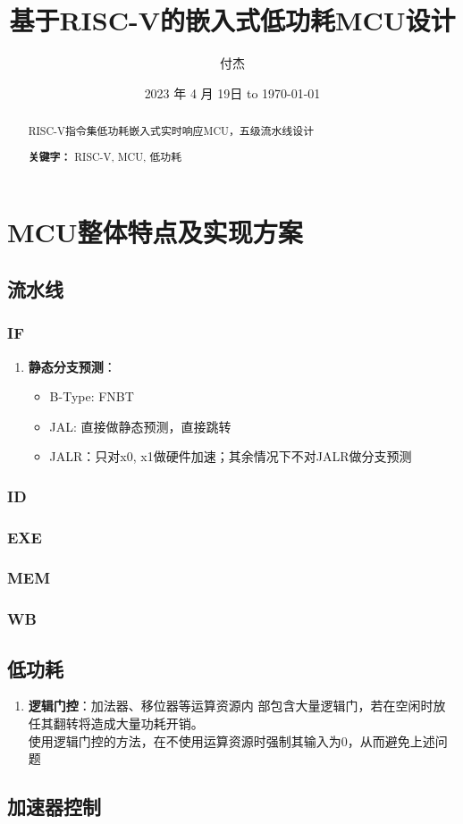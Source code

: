 \documentclass{article}
\title{基于RISC-V的嵌入式低功耗MCU设计}
\author{付杰}
\date{2023 年 4 月 19日 to \today}
\begin{document}
\maketitle
\newpage

\begin{abstract} %
  RISC-V指令集低功耗嵌入式实时响应MCU，五级流水线设计
  \par\textbf{关键字：} RISC-V, MCU, 低功耗
\end{abstract}
\newpage

\tableofcontents %
\newpage


\section{MCU整体特点及实现方案}
\subsection{流水线}
\subsubsection{IF}
\begin{enumerate}
  \item \textbf{静态分支预测}\cite{riscv1}：
    \begin{itemize}
      \item B-Type: FNBT
      \item JAL: 直接做静态预测，直接跳转
      \item JALR：只对x0, x1做硬件加速；其余情况下不对JALR做分支预测
    \end{itemize}
\end{enumerate}
\subsubsection{ID}
\subsubsection{EXE}
\subsubsection{MEM}
\subsubsection{WB}
\subsection{低功耗}
\begin{enumerate}
  \item \textbf{逻辑门控}\cite{riscv1}：加法器、移位器等运算资源内 部包含大量逻辑门，若在空闲时放任其翻转将造成大量功耗开销。\\
   使用逻辑门控的方法，在不使用运算资源时强制其输入为0，从而避免上述问题
\end{enumerate}
\subsection{加速器控制}




\newpage
\end{document}
